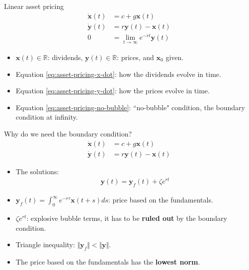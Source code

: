 \documentclass[aspectratio=169,10pt]{beamer}
\newcommand{\emphcolor}[1]{\textbf{\textcolor{emphcolorval}{#1}}}
\begin{document}
\begin{frame}{Linear asset pricing}
\begin{align}
	\dot{\mathbf{x}}(t) &= c + g \mathbf{x}(t) \label{eq:asset-pricing-x-dot}\\%
	\dot{\mathbf{y}}(t) &= r \mathbf{y}(t) - \mathbf{x}(t)  \label{eq:asset-pricing-y-dot}\\%
	0 &= \lim_{t\rightarrow \infty} e^{-r t}\mathbf{y}(t) \label{eq:asset-pricing-no-bubble}%
\end{align}

\begin{itemize}
	\item $\mathbf{x}(t)\in \mathbb{R}$: dividends, $\mathbf{y}(t)\in \mathbb{R}$: prices, and $\mathbf{x}_0$ given. 
	\vspace{0.1in}
	\item Equation \cref{eq:asset-pricing-x-dot}: how the dividends evolve in time.
	\vspace{0.1in}
	\item  Equation \cref{eq:asset-pricing-y-dot}: how the prices evolve in time.
	\vspace{0.1in}
	\item Equation \cref{eq:asset-pricing-no-bubble}: ``no-bubble" condition, the boundary condition at infinity. 
	\end{itemize}
\end{frame}

\begin{frame}{Why do we need the boundary condition?}
	\begin{align*}
		\dot{\mathbf{x}}(t) &= c + g \mathbf{x}(t) \\
		\dot{\mathbf{y}}(t) &= r \mathbf{y}(t) - \mathbf{x}(t)
	\end{align*}
	\begin{itemize}
		\item The solutions: 
		\begin{align*}
			\mathbf{y}(t) = \mathbf{y}_f(t) + \zeta e^{rt}
		\end{align*}
		\item $\mathbf{y}_f(t) = \int_0^\infty e^{-r\tau} \mathbf{x}(t+s)ds$: price based on the fundamentals.
		\vspace{0.1in}
		\item $\zeta e^{rt}$: explosive bubble terms, it has to be \emphcolor{ruled out} by the boundary condition.
		\vspace{0.1in} 
		\item Triangle inequality: $\Vert \mathbf{y}_f\Vert < \Vert \mathbf{y}\Vert$.
		\vspace{0.1in}
		\item The price based on the fundamentals has the \emphcolor{lowest norm}.
	\end{itemize}
\end{frame}
\end{document}

